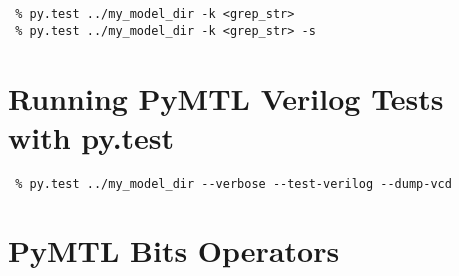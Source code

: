 \documentclass{cbxdoc}
\begin{document}
\begin{lstlisting}[style=simple]
 % py.test ../my_model_dir --verbose --tb=line
 % py.test ../my_model_dir -k <grep_str>
 % py.test ../my_model_dir -k <grep_str> -s
\end{lstlisting}


\section{Running PyMTL Verilog Tests with py.test}

\begin{lstlisting}[style=simple]
 % py.test ../my_model_dir --verbose --test-verilog
 % py.test ../my_model_dir --verbose --test-verilog --dump-vcd
\end{lstlisting}


\clearpage

\section{PyMTL Bits Operators}

\newenvironment{optbl}[3][0.32in]
{
  \vspace{0pt}\centering
  \BF{#2}\vphantom{g}
  \smallskip

  \begin{tabular}{>{\ttfamily\centering\arraybackslash}p{#1}p{#3}}
\toprule
}{
\bottomrule
  \end{tabular}
}
\end{document}
